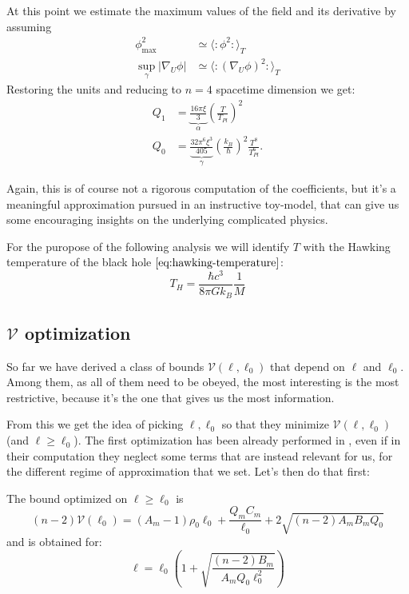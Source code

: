 At this point we estimate the maximum values of the field and its derivative by assuming 
\begin{align*}
	\phi_{\max}^2 &\simeq \langle \colon \phi^2 \colon\rangle_T\\
	\sup_{\gamma}\vert \nabla_U\phi\vert &\simeq \langle \colon (\nabla_U\phi)^2 \colon\rangle_T
\end{align*}
Restoring the units and reducing to \(n = 4\) spacetime dimension we get:
\begin{align}
	\label{eq:KMS_Q_1}
    Q_1 &= \underbrace{\frac{16\pi\xi}{3}}_{\alpha} \left(\frac{T}{T_{Pl}}\right)^2 \\
    Q_0 &= \underbrace{\frac{32\pi^6\xi^3}{405}}_{\gamma}\left(\frac{k_B}{\hbar}\right)^2 \frac{T^8}{T_{Pl}^6}.
\end{align}

Again, this is of course not a rigorous computation of the coefficients, but it's a meaningful approximation pursued in an instructive toy-model, that can give us some encouraging insights on the underlying complicated physics.

For the puropose of the following analysis we will identify \(T\) with the Hawking temperature of the black hole \(\eqref{eq:hawking-temperature}\):
\[
T_H = \frac{\hbar c^3}{8\pi Gk_B}\frac{1}{M}    
\]
    

\subsection[V-optimization]{\(\mathcal{V}\) optimization}

So far we have derived a class of bounds \(\mathcal{V}(\ell, \ell_0)\) that depend on \(\ell\) and \(\ell_0\). Among them, as all of them need to be obeyed, the most interesting is the most restrictive, because it's the one that gives us the most information.

From this we get the idea of picking \(\ell, \ell_0\) so that they minimize \(\mathcal{V}(\ell, \ell_0)\) (and \(\ell \ge \ell_0\)).
The first optimization has been already performed in \cite{fewster2020new}, even if in their computation they neglect some terms that are instead relevant for us, for the different regime of approximation that we set. Let's then do that first:

\begin{prop}
    The bound optimized on \(\ell \ge \ell_0\) is
    \[
      (n-2)\mathcal{V}(\ell_0) = (A_m - 1)\rho_0\ell_0 + \frac{Q_mC_m}{\ell_0} + 2 \sqrt{(n - 2)A_mB_mQ_0}   
    \]
    and is obtained for:
    \[
    \ell = \ell_0\left(1 + \sqrt{\frac{(n - 2) B_m}{A_m Q_0\ell_0^2}}\right)    
    \]
\end{prop}

